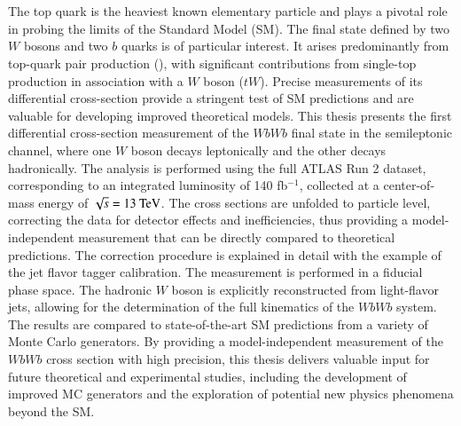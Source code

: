 \chapter{\abstractname}



The top quark is the heaviest known elementary particle and
plays a pivotal role in probing the limits of the Standard Model (SM).
The final state defined by two $W$ bosons and two $b$ quarks is of particular interest. 
It arises predominantly from top-quark pair production (\ttbar), with significant contributions
from single-top production in association with a $W$ boson ($tW$). 
Precise measurements of its differential cross-section provide a stringent test of SM predictions and are valuable
for developing improved theoretical models.
This thesis presents the first differential cross-section measurement of the $WbWb$ final state in the semileptonic channel, 
where one $W$ boson decays leptonically and the other decays hadronically. The analysis is performed using the full 
ATLAS Run 2 dataset, corresponding to an integrated luminosity of 140 fb$^{-1}$, collected at a center-of-mass energy of $\sqrt{s} = 13 ~\text{TeV}$.
The cross sections are unfolded to particle level, correcting the data for detector effects and inefficiencies,
thus providing a model-independent measurement that can be directly compared to theoretical predictions.
The correction procedure is explained in detail with the example of the jet flavor tagger calibration.
The measurement is performed in a fiducial phase space. The hadronic $W$ boson is explicitly reconstructed from light-flavor jets,
allowing for the determination of the full kinematics of the $WbWb$ system.
The results are compared to state-of-the-art SM predictions from a variety of Monte Carlo generators.
By providing a model-independent measurement of the $WbWb$ cross section with high precision, this thesis delivers valuable input
for future theoretical and experimental studies, including the development of improved MC generators and the exploration of potential new physics phenomena
beyond the SM.
